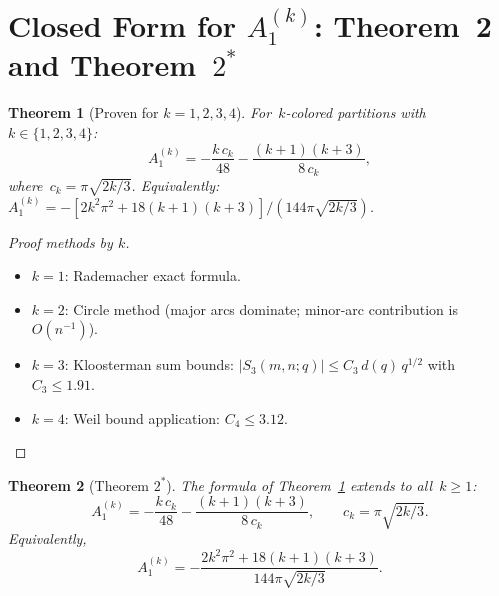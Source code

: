 \documentclass[11pt,a4paper]{article}
\newtheorem{theorem}{Theorem}[section]
\begin{document}
\section{Closed Form for \texorpdfstring{$A_1^{(k)}$}{A1(k)}: Theorem~2 and Theorem~\texorpdfstring{$2^*$}{2*}}\label{sec:theorem2}

\begin{theorem}[Proven for $k = 1, 2, 3, 4$]\label{thm:A1k}
For~$k$-colored partitions with~$k \in \{1,2,3,4\}$:
\begin{equation}\label{eq:A1k}
  A_1^{(k)} = -\frac{k\,c_k}{48} - \frac{(k+1)(k+3)}{8\,c_k},
\end{equation}
where~$c_k = \pi\sqrt{2k/3}$.
Equivalently:~$A_1^{(k)} = -[2k^2\pi^2 + 18(k+1)(k+3)]/(144\pi\sqrt{2k/3})$.
\end{theorem}

\begin{proof}[Proof methods by $k$]
\begin{itemize}
  \item $k=1$: Rademacher exact formula.
  \item $k=2$: Circle method (major arcs dominate; minor-arc contribution is $O(n^{-1})$).
  \item $k=3$: Kloosterman sum bounds: $|S_3(m,n;q)| \leq C_3\,d(q)\,q^{1/2}$ with $C_3 \leq 1.91$.
  \item $k=4$: Weil bound application: $C_4 \leq 3.12$.
\end{itemize}
\end{proof}

\begin{theorem}[Theorem $2^*$]\label{conj:2star}
The formula of Theorem~\ref{thm:A1k} extends to all~$k \geq 1$:
\[
  A_1^{(k)} = -\frac{k\,c_k}{48} - \frac{(k+1)(k+3)}{8\,c_k},
  \qquad c_k = \pi\sqrt{2k/3}.
\]
Equivalently,
\[
  A_1^{(k)} = -\frac{2k^2\pi^2 + 18(k+1)(k+3)}{144\pi\sqrt{2k/3}}.
\]
\end{theorem}
\end{document}
